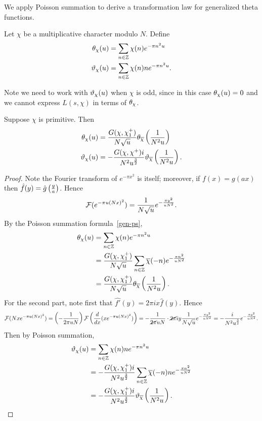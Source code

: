 We apply Poisson summation to derive a transformation law for generalized theta functions.
\begin{df}
Let $\chi$ be a multiplicative character modulo $N$. Define
\begin{align*}
\theta_{\chi}(u)&=\sum_{n\in \mathbb{Z}}\chi(n)e^{-\pi n^2 u}\\
\vartheta_{\chi}(u)&=\sum_{n\in \mathbb{Z}}\chi(n)ne^{-\pi n^2 u}.
\end{align*}
\end{df}
Note we need to work with $\vartheta_{\chi}(u)$ when $\chi$ is odd, since in this case $\theta_{\chi}(u)=0$ and we cannot express $L(s,\chi)$ in terms of $\theta_{\chi}$.
\begin{pr}
Suppose $\chi$ is primitive. Then %
\begin{align*}
\theta_{\chi}(u) &= \frac{G(\chi,\chi^+_1)}{N\sqrt u}\theta_{\overline{\chi}}\left( {\frac{1}{N^2u}} \right)\\
\vartheta_{\chi}(u) &=-\frac{G(\chi,\chi^+)i}{N^2u^{\frac 32}}\vartheta_{\overline{\chi}}\left( {\frac{1}{N^2u}} \right).
\end{align*}
\end{pr}
\begin{proof}
Note the Fourier transform of $e^{-\pi x^2}$ is itself; moreover, if $f(x)=g(ax)$ then $\hat{f}(y)=\hat{g}\left( {\frac{y}{a}} \right)$. Hence
\[
\mathcal{F}(e^{-\pi u(Nx)^2})=\frac{1}{N\sqrt u} e^{-\frac{\pi y^2}{uN^2}}.
\]
By the Poisson summation formula~\ref{gen-ps},
\begin{align*}
\theta_{\chi}(u) &= \sum_{n\in \mathbb{Z}} \chi(n) e^{-\pi n^2u}\\
&= \frac{G(\chi,\chi^+_1)}{N\sqrt{u}} \sum_{n\in \mathbb{Z}} \overline{\chi}(-n)e^{-\frac{\pi n^2}{uN^2}}\\
&=\frac{G(\chi,\chi^+_1)}{N\sqrt u}  \theta_{\overline{\chi}}\left( {\frac{1}{N^2u}} \right).
\end{align*}
For the second part, note first that $\widehat{f'}(y)=2\pi i x \hat{f}(y)$. Hence
\[
\mathcal{F}(Nxe^{-\pi u(Nx)^2})=\left( {-\frac{1}{2\pi u N}} \right)\mathcal{F}\left( {\frac{d}{dx} (xe^{-\pi u (Nx)^2})} \right)
=-\frac{1}{\cancel{2\pi} u N}\cdot \cancel{2\pi} i y\frac{1}{N\sqrt u} e^{-\frac{\pi y^2}{uN^2}}=-\frac{i}{N^2u^{\frac{3}{2}}}e^{-\frac{\pi y^2}{uN^2}}.
\]
Then by Poisson summation,
\begin{align*}
\vartheta_{\chi}(u) &= \sum_{n\in \mathbb{Z}} \chi(n) ne^{-\pi n^2u}\\
&= -\frac{G(\chi,\chi^+_1)i}{N^2u^{\frac 32}} \sum_{n\in \mathbb{Z}} \overline{\chi}(-n)ne^{-\frac{\pi n^2}{uN^2}}\\
&= -\frac{G(\chi,\chi^+_1)i}{N^2u^{\frac 32}}  \vartheta_{\overline{\chi}}\left( {\frac{1}{N^2u}} \right).
\qedhere
\end{align*}
\end{proof}
